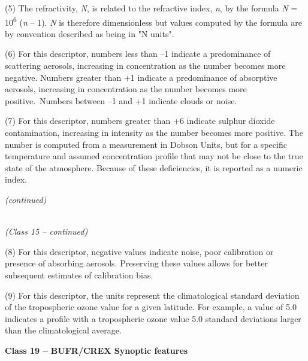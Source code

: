 (5) The refractivity, \emph{N}, is related to the refractive index, \emph{n}, by the formula \emph{N} = 10\textsuperscript{6} (\emph{n} -- 1). \emph{N} is therefore dimensionless but values computed by the formula are by convention described as being in "N units".

(6) For this descriptor, numbers less than --1 indicate a predominance of scattering aerosols, increasing in concentration as the number becomes more negative. Numbers greater than +1 indicate a predominance of absorptive aerosols, increasing in concentration as the number becomes more positive.~Numbers between --1 and +1 indicate clouds or noise.

(7) For this descriptor, numbers greater than +6 indicate sulphur dioxide contamination, increasing in intensity as the number becomes more positive. The number is computed from a measurement in Dobson Units, but for a specific temperature and assumed concentration profile that may not be close to the true state of the atmosphere. Because of these deficiencies, it is reported as a numeric index.

\emph{(continued)}

\emph{\\
(Class 15 -- continued)}

(8) For this descriptor, negative values indicate noise, poor calibration or presence of absorbing aerosols. Preserving these values allows for better subsequent estimates of calibration bias.

(9) For this descriptor, the units represent the climatological standard deviation of the tropospheric ozone value for a given latitude. For example, a value of 5.0 indicates a profile with a tropospheric ozone value 5.0 standard deviations larger than the climatological average.

\textbf{Class 19 -- BUFR/CREX Synoptic features}

